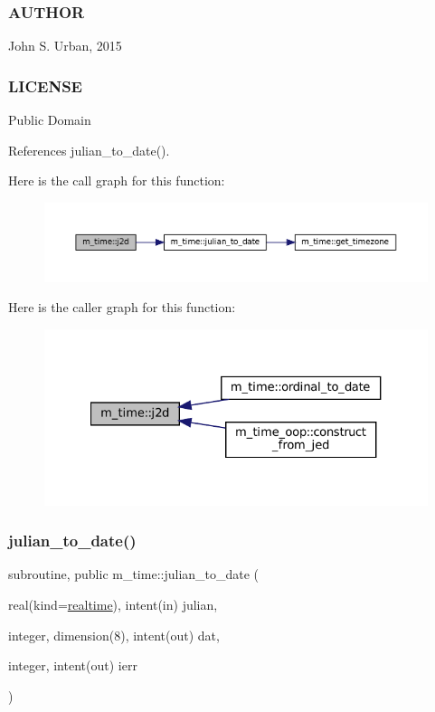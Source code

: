  \subsubsection*{A\+U\+T\+H\+OR}

John S. Urban, 2015 \subsubsection*{L\+I\+C\+E\+N\+SE}

Public Domain 

References julian\+\_\+to\+\_\+date().

Here is the call graph for this function\+:\nopagebreak
\begin{figure}[H]
\begin{center}
\leavevmode
\includegraphics[width=350pt]{namespacem__time_a3ad5cad6df02c53e0429c3602a072e3c_cgraph}
\end{center}
\end{figure}
Here is the caller graph for this function\+:\nopagebreak
\begin{figure}[H]
\begin{center}
\leavevmode
\includegraphics[width=327pt]{namespacem__time_a3ad5cad6df02c53e0429c3602a072e3c_icgraph}
\end{center}
\end{figure}
\mbox{\label{namespacem__time_abb44cf18cd0a3e420c20469efb056203}} 
\subsubsection{\texorpdfstring{julian\+\_\+to\+\_\+date()}{julian\_to\_date()}}
{\footnotesize\ttfamily subroutine, public m\+\_\+time\+::julian\+\_\+to\+\_\+date (\begin{DoxyParamCaption}\item[{real(kind=\mbox{\hyperlink{namespacem__time_ac10ea9e8d59ec74eaa7d89f2517d7422}{realtime}}), intent(in)}]{julian,  }\item[{integer, dimension(8), intent(out)}]{dat,  }\item[{integer, intent(out)}]{ierr }\end{DoxyParamCaption})}



